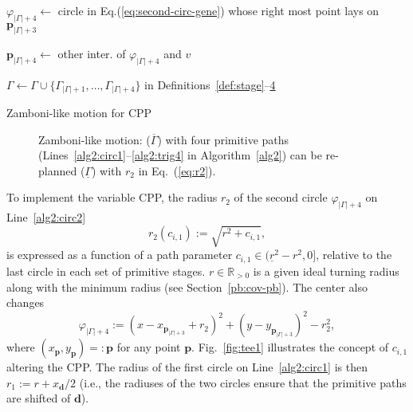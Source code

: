 \documentclass[letterpaper,10pt,journal,twoside]{IEEEtran}
\newcommand{\figpath}{./figures}
\theoremstyle{definition}
\begin{document}
\begin{algorithm}[t]
\begin{algorithmic}[1]
          \STATE $\varphi_{|\Gamma|+4}\gets$ circle in Eq.\hspace*{.7ex}(\ref{eq:second-circ-gene}) 
          whose right most point lays\vspace*{.3ex} \hspace*{1em}on $\mathbf{p}_{|\Gamma|+3}$\vspace*{.3ex}\label{alg2:circ2}

          \STATE $\mathbf{p}_{|\Gamma|+4}\gets$ other inter. %
          of $\varphi_{|\Gamma|+4}$ and $v$\vspace*{.3ex}\label{alg2:trig4}

          \vspace*{.8ex}
          \STATE $\Gamma\gets\Gamma\cup\{\Gamma_{|\Gamma|+1},\dots,\Gamma_{|\Gamma|+4}\}${ in Definitions~\ref{def:stage}--\hyperref[def:plan]{4}}\label{alg2:last}

        \ENDIF
      \ENDIF
    \ENDFOR
  \end{algorithmic}
  \caption{Zamboni-like motion for CPP}\label{alg2}
\end{algorithm}

\begin{figure}[t]
  \footnotesize
  \begin{minipage}[l]{0.73\columnwidth}
    \centering
    \vspace*{-2ex}
    
  \end{minipage}\hfill
  \begin{minipage}[l]{0.25\columnwidth}
    \caption{Zamboni-like motion: ($\overline{\Gamma}$) with four primitive paths (Lines~\ref{alg2:circ1}--\ref{alg2:trig4} in Algorithm~\ref{alg2}) can be re-planned ($\underline{\Gamma}$) with $r_2$ in Eq.~(\ref{eq:r2}).}
    \label{fig:zambo}
  \end{minipage}
  \vspace*{-4.5ex}
\end{figure}

To implement the variable CPP, the radius $r_2$ of the second circle $\varphi_{|\Gamma|+4}$ on Line~\ref{alg2:circ2}
\begin{equation}\label{eq:r2}
  r_2(c_{i,1}):=\sqrt{r^2+c_{i,1}},
\end{equation}
is expressed as a function of a path parameter $c_{i,1}\in(\underline{r}^2-r^2,0]$, relative to the last circle in each set of primitive stages. $r\in\mathbb{R}_{>0}$ is a given ideal turning radius along with the minimum radius (see Section~\ref{pb:cov-pb}). The center also changes
\begin{equation}\label{eq:second-circ-gene}
  \varphi_{|\Gamma|+4}:=(x-x_{\mathbf{p}_{|\Gamma|+3}}+r_2)^2+(y-y_{\mathbf{p}_{|\Gamma|+3}})^2-r_2^2,
\end{equation}
where $(x_\mathbf{p},y_\mathbf{p})=:\mathbf{p}$ for any point $\mathbf{p}$. Fig.~\ref{fig:tee1} illustrates the concept of $c_{i,1}$ altering the CPP. The radius of the first circle on Line~\ref{alg2:circ1} is then $r_1:=r+x_\mathbf{d}/2$ (i.e., the radiuses of the two circles ensure that the primitive paths are shifted of $\mathbf{d}$).%
\end{document}
